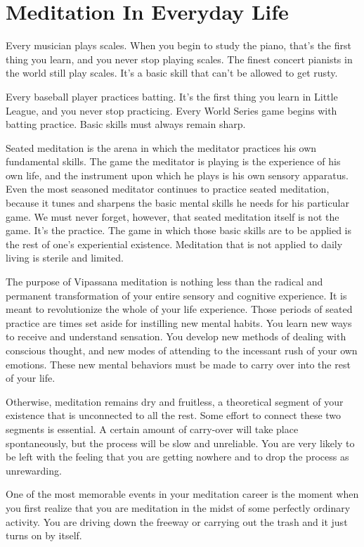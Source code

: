 \chapter{Meditation In Everyday Life}

Every musician plays scales. When you
begin to study the piano, that's the first thing you learn, and you never stop
playing scales. The finest concert pianists in the world still play scales. It's
a basic skill that can't be allowed to get rusty.

Every baseball player practices batting. It's the first thing you learn in
Little League, and you never stop practicing. Every World Series game begins
with batting practice. Basic skills must always remain sharp.

Seated meditation is the arena in which the meditator practices his own
fundamental skills. The game the meditator is playing is the experience of his
own life, and the instrument upon which he plays is his own sensory apparatus.
Even the most seasoned meditator continues to practice seated meditation,
because it tunes and sharpens the basic mental skills he needs for his
particular game. We must never forget, however, that seated meditation itself is
not the game. It's the practice. The game in which those basic skills are to be
applied is the rest of one's experiential existence. Meditation that is not
applied to daily living is sterile and limited.

The purpose of Vipassana meditation is nothing less than the radical and
permanent transformation of your entire sensory and cognitive experience. It is
meant to revolutionize the whole of your life experience. Those periods of
seated practice are times set aside for instilling new mental habits. You learn
new ways to receive and understand sensation. You develop new methods of dealing
with conscious thought, and new modes of attending to the incessant rush of your
own emotions. These new mental behaviors must be made to carry over into the
rest of your life.

Otherwise, meditation remains dry and fruitless, a theoretical segment of your
existence that is unconnected to all the rest. Some effort to connect these two
segments is essential. A certain amount of carry-over will take place
spontaneously, but the process will be slow and unreliable. You are very likely
to be left with the feeling that you are getting nowhere and to drop the process
as unrewarding.

One of the most memorable events in your meditation career is the moment when
you first realize that you are meditation in the midst of some perfectly
ordinary activity. You are driving down the freeway or carrying out the trash
and it just turns on by itself.

